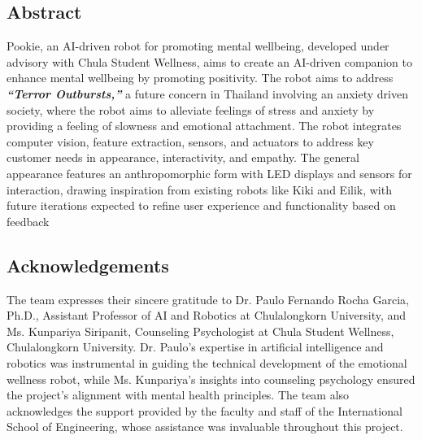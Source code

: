 \documentclass[a4paper,10pt]{article}
\begin{document}
\newpage
\begin{center}
    \item\section*{Abstract}
\end{center}
\large
Pookie, an AI-driven robot for promoting mental wellbeing, developed under advisory with Chula Student Wellness, aims to create an AI-driven companion to enhance mental wellbeing by promoting positivity. The robot aims to address \textbf{\textit{“Terror Outbursts,”}}  a future concern in Thailand involving an anxiety driven society, where the robot aims to alleviate feelings of stress and anxiety by providing a feeling of slowness and emotional attachment. The robot integrates computer vision, feature extraction, sensors, and actuators to address key customer needs in appearance, interactivity, and empathy. The general appearance features an anthropomorphic form with LED displays and sensors for interaction, drawing inspiration from existing robots like Kiki and Eilik, with future iterations expected to refine user experience and functionality based on feedback
\newpage
\begin{center}
    \item\section*{Acknowledgements}
\end{center}
The team expresses their sincere gratitude to Dr. Paulo Fernando Rocha Garcia, Ph.D., Assistant Professor of AI and Robotics at Chulalongkorn University, and Ms. Kunpariya Siripanit, Counseling Psychologist at Chula Student Wellness, Chulalongkorn University. Dr. Paulo’s expertise in artificial intelligence and robotics was instrumental in guiding the technical development of the emotional wellness robot, while Ms. Kunpariya’s insights into counseling psychology ensured the project’s alignment with mental health principles. The team also acknowledges the support provided by the faculty and staff of the International School of Engineering, whose assistance was invaluable throughout this project. 

\newpage
\tableofcontents

\newpage

\newpage

\newpage    

\newpage

\newpage

\newpage


\newpage

\newpage


\newpage
{}


\end{document}

